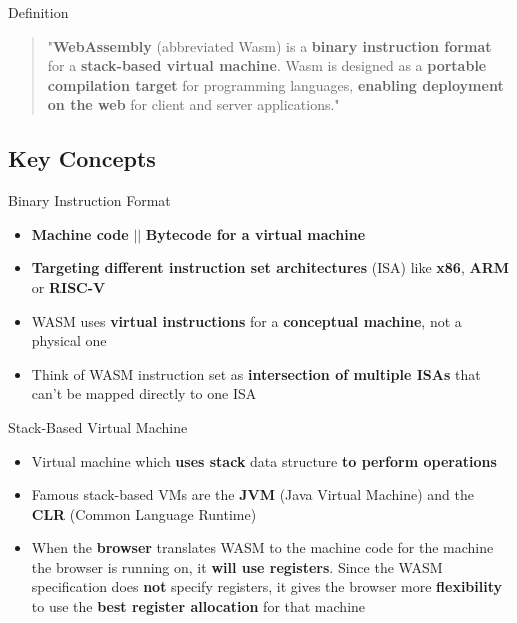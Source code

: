 \documentclass{beamer}
\begin{document}
\begin{frame}{Definition}
    \begin{quotation}
        "\textbf{WebAssembly} (abbreviated Wasm) is a \textbf{binary instruction format} for a \textbf{stack-based virtual machine}. Wasm is designed as a \textbf{portable compilation target} for programming languages, \textbf{enabling deployment on the web} for client and server applications."
    \end{quotation}
\end{frame}

\subsection{Key Concepts}

\begin{frame}{Binary Instruction Format}
    \begin{itemize}
        \item \textbf{Machine code} $||$ \textbf{Bytecode for a virtual machine}
        \item \textbf{Targeting different instruction set architectures} (ISA) like \textbf{x86}, \textbf{ARM} or \textbf{RISC-V}
        \item WASM uses \textbf{virtual instructions} for a \textbf{conceptual machine}, not a physical one
        \item Think of WASM instruction set as \textbf{intersection of multiple ISAs} that can't be mapped directly to one ISA
    \end{itemize}
\end{frame}

\begin{frame}{Stack-Based Virtual Machine}
    \begin{itemize}
        \item Virtual machine which \textbf{uses stack} data structure \textbf{to perform operations}
        \item Famous stack-based VMs are the \textbf{JVM} (Java Virtual Machine) and the \textbf{CLR} (Common Language Runtime)
        \item When the \textbf{browser} translates WASM to the machine code for the machine the browser is running on, it \textbf{will use registers}. Since the WASM specification does \textbf{not} specify registers, it gives the browser more \textbf{flexibility} to use the \textbf{best register allocation} for  that machine
    \end{itemize}
\end{frame}
\end{document}
